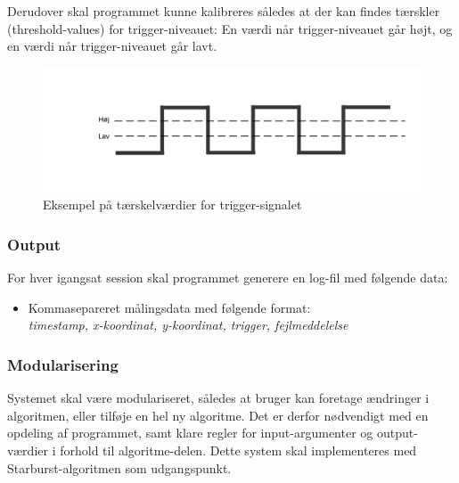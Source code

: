 \documentclass[rapport.tex]{subfiles}
\begin{document}
	
	Derudover skal programmet kunne kalibreres således at der kan findes tærskler (threshold-values) for trigger-niveauet: En værdi når trigger-niveauet går højt, og en værdi når trigger-niveauet går lavt.
	
	\begin{figure}[H]
		\centering
		\includegraphics[width=0.7\linewidth]{../Trigger-threshold}
		\caption{Eksempel på tærskelværdier for trigger-signalet}
		\label{fig:Trigger-threshold}
	\end{figure}
	
	
	
	\subsubsection{Output}
	For hver igangsat session skal programmet generere en log-fil med følgende data:
	\indent \begin{itemize}
		
		\item 	Kommasepareret målingsdata med følgende format: \\
		\textit{timestamp, x-koordinat, y-koordinat, trigger, fejlmeddelelse}
	\end{itemize}
	
	\subsubsection{Modularisering}
	Systemet skal være modulariseret, således at bruger kan foretage ændringer i algoritmen, eller tilføje en hel ny algoritme. Det er derfor nødvendigt med en opdeling af programmet, samt klare regler for input-argumenter og output-værdier i forhold til algoritme-delen. 
	Dette system skal implementeres med Starburst-algoritmen som udgangspunkt.
	
\end{document}

